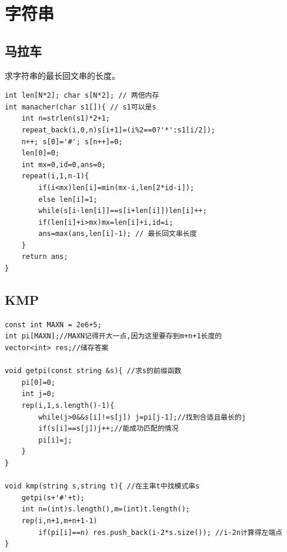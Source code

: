 \documentclass[a4]{ctexart}
\begin{document}
\section{字符串}

\subsection{马拉车}
求字符串的最长回文串的长度。
\begin{lstlisting}
int len[N*2]; char s[N*2]; // 两倍内存
int manacher(char s1[]){ // s1可以是s
	int n=strlen(s1)*2+1;
	repeat_back(i,0,n)s[i+1]=(i%2==0?'*':s1[i/2]);
	n++; s[0]='#'; s[n++]=0;
	len[0]=0;
	int mx=0,id=0,ans=0;
	repeat(i,1,n-1){
		if(i<mx)len[i]=min(mx-i,len[2*id-i]);
		else len[i]=1;
		while(s[i-len[i]]==s[i+len[i]])len[i]++;
		if(len[i]+i>mx)mx=len[i]+i,id=i;
		ans=max(ans,len[i]-1); // 最长回文串长度
	}
	return ans;
}
\end{lstlisting}

\subsection{KMP}
\begin{lstlisting}
const int MAXN = 2e6+5;
int pi[MAXN];//MAXN记得开大一点,因为这里要存到m+n+1长度的 
vector<int> res;//储存答案
 
void getpi(const string &s){ //求s的前缀函数
	pi[0]=0;
	int j=0;
	rep(i,1,s.length()-1){
		while(j>0&&s[i]!=s[j]) j=pi[j-1];//找到合适且最长的j 
		if(s[i]==s[j])j++;//能成功匹配的情况 
		pi[i]=j;
	}
}

void kmp(string s,string t){ //在主串t中找模式串s 
	getpi(s+'#'+t);
	int n=(int)s.length(),m=(int)t.length();
	rep(i,n+1,m+n+1-1)
		if(pi[i]==n) res.push_back(i-2*s.size()); //i-2n计算得左端点 
}
\end{lstlisting}
\end{document}
